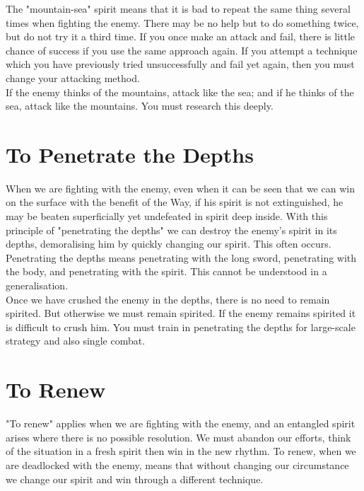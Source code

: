 The "mountain-sea" spirit means that it is bad to repeat the same thing several times when fighting the enemy. There may be no help but to do something twice, but do not try it a third time. If you once make an attack and fail, there is little chance of success if you use the same approach again. If you attempt a technique which you have previously tried unsuccessfully and fail yet again, then you must change your attacking method.\\

If the enemy thinks of the mountains, attack like the sea; and if he thinks of the sea, attack like the mountains. You must research this deeply.\\
\section{To Penetrate the Depths}

When we are fighting with the enemy, even when it can be seen that we can win on the surface with the benefit of the Way, if his spirit is not extinguished, he may be beaten superficially yet undefeated in spirit deep inside. With this principle of "penetrating the depths" we can destroy the enemy's spirit in its depths, demoralising him by quickly changing our spirit. This often occurs.\\

Penetrating the depths means penetrating with the long sword, penetrating with the body, and penetrating with the spirit. This cannot be understood in a generalisation.\\

Once we have crushed the enemy in the depths, there is no need to remain spirited. But otherwise we must remain spirited. If the enemy remains spirited it is difficult to crush him. You must train in penetrating the depths for large-scale strategy and also single combat.\\
\section{To Renew}

"To renew" applies when we are fighting with the enemy, and an entangled spirit arises where there is no possible resolution. We must abandon our efforts, think of the situation in a fresh spirit then win in the new rhythm. To renew, when we are deadlocked with the enemy, means that without changing our circumstance we change our spirit and win through a different technique.\\

